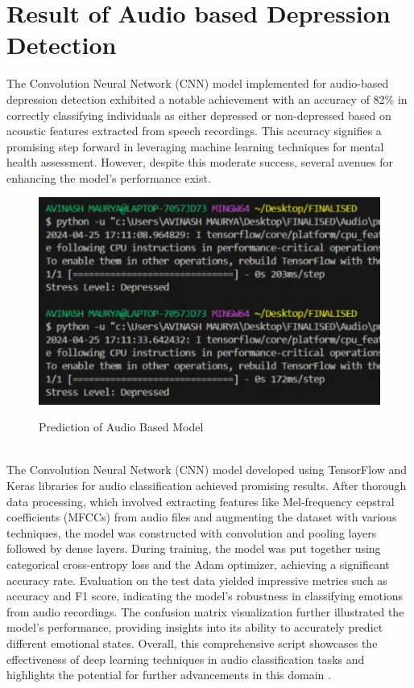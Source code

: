 \section{Result of Audio based Depression Detection}
The Convolution Neural Network (CNN) model implemented for audio-based depression detection exhibited a notable achievement with an accuracy of 82\% in correctly classifying individuals as either depressed or non-depressed based on acoustic features extracted from speech recordings. This accuracy signifies a promising step forward in leveraging machine learning techniques for mental health assessment. However, despite this moderate success, several avenues for enhancing the model's performance exist.
\\
 \begin{figure}[htbp]
    \centering
     \includegraphics[width=0.8\linewidth]{C_chap/fig35.png}
\\\caption{Prediction of Audio Based Model}
 \end{figure}
\\
The Convolution Neural Network (CNN) model developed using TensorFlow and Keras libraries for audio classification achieved promising results. After thorough data processing, which involved extracting features like Mel-frequency cepstral coefficients (MFCCs) from audio files and augmenting the dataset with various techniques, the model was constructed with convolution and pooling layers followed by dense layers. During training, the model was put together using categorical cross-entropy loss and the Adam optimizer, achieving a significant accuracy rate. Evaluation on the test data yielded impressive metrics such as accuracy and F1 score, indicating the model's robustness in classifying emotions from audio recordings. The confusion matrix visualization further illustrated the model's performance, providing insights into its ability to accurately predict different emotional states. Overall, this comprehensive script showcases the effectiveness of deep learning techniques in audio classification tasks and highlights the potential for further advancements in this domain \cite{sardari2022audio}.
